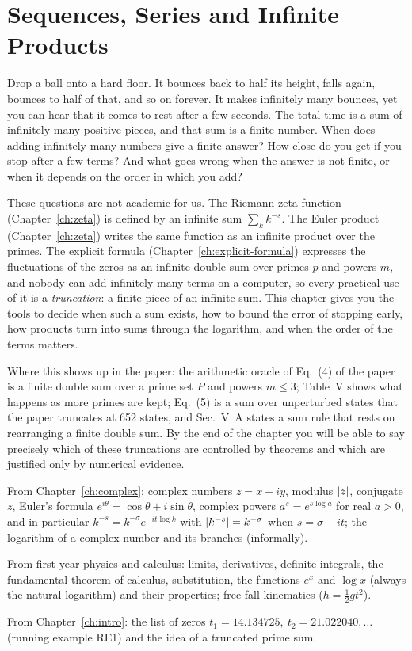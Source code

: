\chapter{Sequences, Series and Infinite Products}\label{ch:series}

\begin{chapterintro}
Drop a ball onto a hard floor. It bounces back to half its height, falls again, bounces to half of that, and so on forever. It makes infinitely many bounces, yet you can hear that it comes to rest after a few seconds. The total time is a sum of infinitely many positive pieces, and that sum is a finite number. When does adding infinitely many numbers give a finite answer? How close do you get if you stop after a few terms? And what goes wrong when the answer is not finite, or when it depends on the order in which you add?

These questions are not academic for us. The Riemann zeta function (Chapter~\ref{ch:zeta}) is defined by an infinite sum $\sum_k k^{-s}$. The Euler product (Chapter~\ref{ch:zeta}) writes the same function as an infinite product over the primes. The explicit formula (Chapter~\ref{ch:explicit-formula}) expresses the fluctuations of the zeros as an infinite double sum over primes $p$ and powers $m$, and nobody can add infinitely many terms on a computer, so every practical use of it is a \emph{truncation}: a finite piece of an infinite sum. This chapter gives you the tools to decide when such a sum exists, how to bound the error of stopping early, how products turn into sums through the logarithm, and when the order of the terms matters.

Where this shows up in the paper: the arithmetic oracle of Eq.~(4) of the paper~\cite{soniR1} is a finite double sum over a prime set $P$ and powers $m\le 3$; Table~V shows what happens as more primes are kept; Eq.~(5) is a sum over unperturbed states that the paper truncates at 652 states, and Sec.~V~A states a sum rule that rests on rearranging a finite double sum. By the end of the chapter you will be able to say precisely which of these truncations are controlled by theorems and which are justified only by numerical evidence.
\end{chapterintro}

\begin{prerequisites}
\item From Chapter~\ref{ch:complex}: complex numbers $z=x+iy$, modulus $\left\lvert z\right\rvert$, conjugate $\bar z$, Euler's formula $e^{i\theta}=\cos\theta+i\sin\theta$, complex powers $a^{s}=e^{s\log a}$ for real $a>0$, and in particular $k^{-s}=k^{-\sigma}e^{-it\log k}$ with $\left\lvert k^{-s}\right\rvert=k^{-\sigma}$ when $s=\sigma+it$; the logarithm of a complex number and its branches (informally).
\item From first-year physics and calculus: limits, derivatives, definite integrals, the fundamental theorem of calculus, substitution, the functions $e^x$ and $\log x$ (always the natural logarithm) and their properties; free-fall kinematics ($h=\tfrac12 g t^2$).
\item From Chapter~\ref{ch:intro}: the list of zeros $t_1=14.134725,\ t_2=21.022040,\dots$ (running example RE1) and the idea of a truncated prime sum.
\end{prerequisites}

